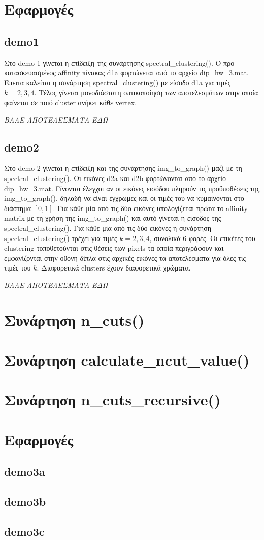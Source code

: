 \documentclass{article}
\begin{document}
\section{Εφαρμογές}
\subsection{demo1} 
Στο demo 1 γίνεται η επίδειξη της συνάρτησης spectral\_clustering(). Ο 
προ-κατασκευασμένος affinity πίνακας d1a φορτώνεται από το αρχείο dip\_hw\_3.mat. 
Έπειτα καλείται η συνάρτηση spectral\_clustering() με είσοδο d1a για τιμές $k = 2,3,4$.
Τέλος γίνεται μονοδιάστατη οπτικοποίηση των αποτελεσμάτων στην οποία φαίνεται 
σε ποιό cluster ανήκει κάθε vertex. 

\emph{ΒΑΛΕ ΑΠΟΤΕΛΕΣΜΑΤΑ ΕΔΩ}
\subsection{demo2}
Στο demo 2 γίνεται η επίδειξη και της συνάρτησης img\_to\_graph() μαζί με τη 
spectral\_clustering(). Οι εικόνες d2a και d2b φορτώνονται από το αρχείο 
dip\_hw\_3.mat. Γίνονται έλεγχοι αν οι εικόνες εισόδου πληρούν τις προϋποθέσεις 
της img\_to\_graph(), δηλαδή να είναι έγχρωμες και οι τιμές του να κυμαίνονται 
στο διάστημα $[0,1]$. Για κάθε μία από τις δύο εικόνες υπολογίζεται πρώτα το
affinity matrix με τη χρήση της img\_to\_graph() και αυτό γίνεται η είσοδος
της spectral\_clustering(). Για κάθε μία από τις δύο εικόνες η συνάρτηση 
spectral\_clustering() τρέχει για τιμές $k = 2,3,4$, συνολικά 6 φορές. Οι
ετικέτες του clustering τοποθετούνται στις θέσεις των pixels τα οποία περιγράφουν
και εμφανίζονται στην οθόνη δίπλα στις αρχικές εικόνες τα αποτελέσματα για όλες 
τις τιμές του $k$. Διαφορετικά clusters έχουν διαφορετικά χρώματα.

\emph{ΒΑΛΕ ΑΠΟΤΕΛΕΣΜΑΤΑ ΕΔΩ}
\section{Συνάρτηση n\_cuts()}
\section{Συνάρτηση calculate\_ncut\_value()}
\section{Συνάρτηση n\_cuts\_recursive()}
\section{Εφαρμογές}
\subsection{demo3a} 
\subsection{demo3b}
\subsection{demo3c}
\end{document}
